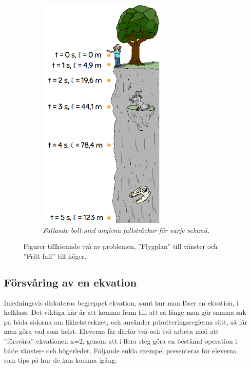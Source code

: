 \begin{figure}
\begin{subfigure}[b]{0.45\textwidth}
        \includegraphics[width=0.7\textwidth]{Figures/FrittFall.PNG}
        \caption{\textsl{Fallande boll med angivna fallsträckor för varje sekund.}}
        \label{fig:FrittFall}
    \end{subfigure}
    \hspace{0.4cm}
    \caption{Figurer tillhörande två av problemen, ''Flygplan'' till vänster och ''Fritt fall'' till höger.}
    \label{fig:three graphs}
\end{figure}
    
    
    
\subsection{Försvåring av en ekvation}
    \label{sec:ekvation}

    \textcolor{lila}{Inledningsvis diskuteras begreppet ekvation, samt hur man löser en ekvation, i helklass. Det viktiga här är att komma fram till att så länge man gör samma sak på båda sidorna om likhetstecknet, och använder prioriteringsreglerna rätt, så får man göra vad som helst. Eleverna får därför två och två arbeta med att ''försvåra'' ekvationen x=2, genom att i flera steg göra en bestämd operation i både vänster- och högerledet. Följande enkla exempel presenteras för eleverna som tips på hur de kan komma igång:}
    
